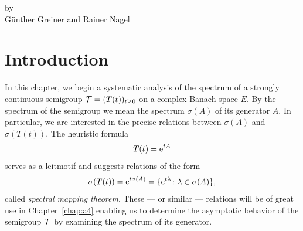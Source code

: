 \label{chap:a3}%
\pagestyle{headings}
\thispagestyle{empty}
{\Large
\vspace*{-.75cm}
by \\[.25em]
Günther Greiner and Rainer Nagel 
\vspace{.75cm}
\\
}
\section{Introduction}\label{sec:a3-1}%
In this chapter, we begin a systematic analysis of the spectrum of a strongly continuous semigroup $\TT = (T(t))_{t\geq 0}$ on a complex Banach space $E$.
By the spectrum of the semigroup we mean the spectrum $\sigma(A)$ of its generator $A$.
In particular, we are interested in the precise relations between $\sigma(A)$ and $\sigma(T(t))$.
The heuristic formula
\[
	T(t) = \mathrm{e}^{tA}
\]
serves as a leitmotif and suggests relations of the form
\[
\sigma(T(t)) = \mathrm{e}^{t\sigma(A)} = \{ \mathrm{e}^{t\lambda} \colon \lambda \in \sigma
(A) \} ,
\]
called \emph{spectral mapping theorem}.
These --- or similar --- relations will be of great use in Chapter~\ref{chap:a4} enabling us to determine the asymptotic behavior of the semigroup $\mathcal{T}$ by examining the spectrum of its generator.


